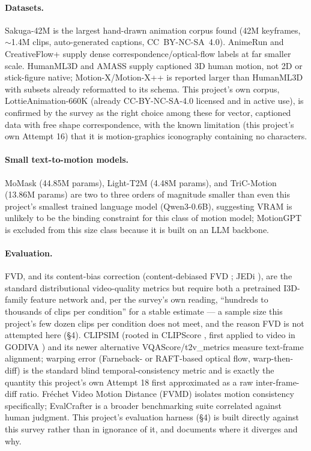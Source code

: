 \documentclass[11pt]{article}
\newcommand{\secsym}{\S}
\begin{document}
\paragraph{Datasets.} Sakuga-42M \cite{sakuga42m2024} is the largest
hand-drawn animation corpus found (42M keyframes, $\sim$1.4M clips,
auto-generated captions, CC~BY-NC-SA~4.0). AnimeRun
\cite{animerun2022} and CreativeFlow+ \cite{creativeflowplus} supply dense
correspondence/optical-flow labels at far smaller scale. HumanML3D
\cite{humanml3d} and AMASS \cite{amass} supply captioned 3D human motion,
not 2D or stick-figure native; Motion-X/Motion-X++ \cite{motionx2025} is
reported larger than HumanML3D with subsets already reformatted to its
schema. This project's own corpus, LottieAnimation-660K
\cite{lottieanimation660k} (already CC-BY-NC-SA-4.0 licensed and in active
use), is confirmed by the survey as the right choice among these for
vector, captioned data with free shape correspondence, with the known
limitation (this project's own Attempt 16) that it is motion-graphics
iconography containing no characters.

\paragraph{Small text-to-motion models.} MoMask \cite{momask2024}
(44.85M params), Light-T2M \cite{lightt2m2024} (4.48M params), and
TriC-Motion \cite{tricmotion2026} (13.86M params) are two to three orders
of magnitude smaller than even this project's smallest trained language
model (Qwen3-0.6B), suggesting VRAM is unlikely to be the binding
constraint for this class of motion model; MotionGPT
\cite{motiongpt2023} is excluded from this size class because it is built
on an LLM backbone.

\paragraph{Evaluation.} FVD, and its content-bias correction
\cite{fvdcontentbias2024} (content-debiased FVD \cite{contentdebiasedfvd};
JEDi \cite{jedi2024}), are the standard distributional video-quality
metrics but require both a pretrained I3D-family feature network and, per
the survey's own reading, ``hundreds to thousands of clips per condition''
for a stable estimate --- a sample size this project's few dozen clips per
condition does not meet, and the reason FVD is not attempted here
(\secsym4). CLIPSIM (rooted in CLIPScore \cite{hessel2021clipscore}, first
applied to video in GODIVA \cite{godiva2021}) and its newer alternative
VQAScore/t2v\_metrics \cite{vqascore} measure text-frame alignment;
warping error (Farneback- or RAFT-based optical flow, warp-then-diff) is
the standard blind temporal-consistency metric and is exactly the quantity
this project's own Attempt 18 first approximated as a raw inter-frame-diff
ratio. Fr\'echet Video Motion Distance (FVMD) \cite{fvmd} isolates motion
consistency specifically; EvalCrafter \cite{evalcrafter2023} is a broader
benchmarking suite correlated against human judgment. This project's
evaluation harness (\secsym4) is built directly against this survey rather
than in ignorance of it, and documents where it diverges and why.
\end{document}
